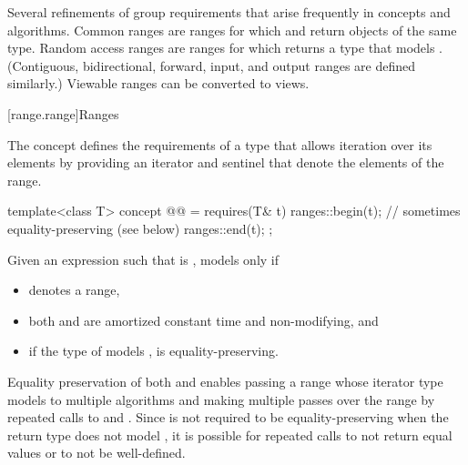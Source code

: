\pnum
Several refinements of  group requirements
that arise frequently in concepts and algorithms.
Common ranges are ranges for which
 and 
return objects of the same type.
Random access ranges are ranges for which 
returns a type that models
.
(Contiguous, bidirectional, forward, input, and output ranges
are defined similarly.)
Viewable ranges can be converted to views.

[range.range]{Ranges}

\pnum
The  concept defines the requirements of a type that allows
iteration over its elements by providing an iterator and sentinel
that denote the elements of the range.

\begin{itemdecl}
template<class T>
  concept @@ =
    requires(T& t) {
      ranges::begin(t);         // sometimes equality-preserving (see below)
      ranges::end(t);
    };
\end{itemdecl}

\begin{itemdescr}
\pnum
Given an expression  such that  is ,
 models  only if
\begin{itemize}
\item {}
  denotes a range,

\item both
and
are amortized constant time and non-modifying, and

\item if the type of  models
,  is equality-preserving.
\end{itemize}

\pnum
\begin{note}
Equality preservation of both  and
 enables passing a range whose iterator
type models  to multiple
algorithms and making multiple passes over the range by repeated calls to
 and .
Since  is not required to be equality-preserving
when the return type does not model ,
it is possible for repeated calls
to not return equal values or to not be well-defined.
\end{note}
\end{itemdescr}


